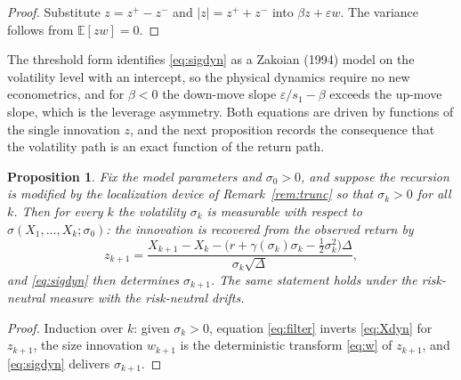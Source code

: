 \documentclass[11pt]{article}
\newtheorem{proposition}[theorem]{Proposition}
\theoremstyle{remark}
\newcommand{\E}{\mathbb{E}}
\newcommand{\Dt}{\Delta}
\begin{document}
\begin{proof}
Substitute $z=z^{+}-z^{-}$ and $|z|=z^{+}+z^{-}$ into
$\beta z+\varepsilon w$.
The variance follows from $\E[zw]=0$.
\end{proof}

The threshold form identifies \eqref{eq:sigdyn} as a Zakoian (1994) model
on the volatility level with an intercept, so the physical dynamics require
no new econometrics, and for $\beta<0$ the down-move slope
$\varepsilon/s_1-\beta$ exceeds the up-move slope, which is the leverage
asymmetry.
Both equations are driven by functions of the single innovation $z$, and
the next proposition records the consequence that the volatility path is an
exact function of the return path.

\begin{proposition}\label{prop:filter}
Fix the model parameters and $\sigma_0>0$, and suppose the recursion is
modified by the localization device of Remark~\ref{rem:trunc} so that
$\sigma_k>0$ for all $k$.
Then for every $k$ the volatility $\sigma_k$ is measurable with respect to
$\sigma(X_1,\dots,X_k;\sigma_0)$: the innovation is recovered from the
observed return by
\begin{equation}\label{eq:filter}
z_{k+1}
=\frac{X_{k+1}-X_k-\big(r+\gamma(\sigma_k)\sigma_k
-\tfrac{1}{2}\sigma_k^2\big)\Dt}{\sigma_k\sqrt{\Dt}},
\end{equation}
and \eqref{eq:sigdyn} then determines $\sigma_{k+1}$.
The same statement holds under the risk-neutral measure with the
risk-neutral drifts.
\end{proposition}

\begin{proof}
Induction over $k$: given $\sigma_k>0$, equation \eqref{eq:filter} inverts
\eqref{eq:Xdyn} for $z_{k+1}$, the size innovation $w_{k+1}$ is the
deterministic transform \eqref{eq:w} of $z_{k+1}$, and \eqref{eq:sigdyn}
delivers $\sigma_{k+1}$.
\end{proof}
\end{document}
